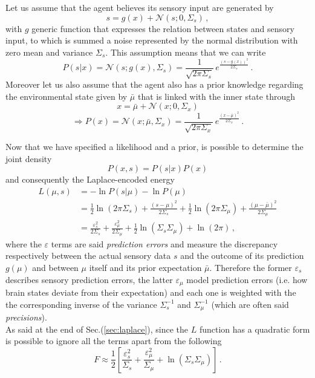 \documentclass[a4paper, 10pt]{article}
\begin{document}
Let us assume that the agent believes its sensory input are generated by
\begin{equation}
s = g(x) + \mathcal{N}(s;0,\Sigma_s) \, ,
\label{eqn:input}
\end{equation}
with $g$ generic function that expresses the relation between states and sensory input, to which is summed a noise represented by the normal distribution with zero mean and variance $\Sigma_s$. This assumption means that we can write
\begin{equation}
P(s|x) = \mathcal{N}(s;g(x),\Sigma_s) = \frac{1}{\sqrt{ 2 \pi \Sigma_{s}}} \, e^{\frac{(s-g(x))^2}{2 \Sigma_{s}}} \, .
\end{equation}
Moreover let us also assume that the agent also has a prior knowledge regarding the environmental state given by $\bar{\mu}$ that is linked with the inner state through
\begin{equation}
x = \bar{\mu} + \mathcal{N}(x;0,\Sigma_{x})
\end{equation}
\begin{equation}
\Rightarrow P(x) = \mathcal{N}(x;\bar{\mu},\Sigma_{x}) =\frac{1}{\sqrt{ 2 \pi \Sigma_{x}}} \, e^{\frac{(x-\bar{\mu})^2}{2 \Sigma_{x}}} \, .
\end{equation}

Now that we have specified a likelihood and a prior, is possible to determine the joint density
\begin{equation}
P(x,s) = P(s | x) P(x)
\end{equation}
and consequently the Laplace-encoded energy
\begin{equation}
\begin{split}
L(\mu,s) & = - \ln P(s|\mu) - \ln P(\mu)  \\
		 & = \frac{1}{2} \ln (2 \pi \Sigma_{s}) + \frac{(s-\mu)^2}{2 \Sigma_{s}} + \frac{1}{2} \ln (2 \pi \Sigma_{\mu}) + \frac{(\mu-\bar{\mu})^2}{2 \Sigma_{\mu}} \\
		 & = \frac{\varepsilon_{s}^2}{2 \Sigma_{s}} + \frac{\varepsilon_{\mu}^2}{2 \Sigma_{\mu}} + \frac{1}{2} \ln \left( \Sigma_{s} \Sigma_{\mu} \right) + \ln (2 \pi) \, ,
\end{split}
\end{equation}
where the $\varepsilon$ terms are said \emph{prediction errors} and measure the discrepancy respectively between the actual sensory data $s$ and the outcome of its prediction $g(\mu)$ and between $\mu$ itself and its prior expectation $\bar{\mu}$. Therefore the former $\varepsilon_{s}$ describes sensory prediction errors, the latter $\varepsilon_{\mu}$ model prediction errors (i.e. how brain states deviate from their expectation) and each one is weighted with the the corresponding inverse of the variance $\Sigma_{s}^{-1}$ and $\Sigma_{\mu}^{-1}$ (which are often said \emph{precisions}). \\
As said at the end of Sec.(\ref{sec:laplace}), since the $L$ function has a quadratic form is possible to ignore all the terms apart from the following
\begin{equation}
F \approx \frac{1}{2} \left[\frac{\varepsilon_{s}^2}{\Sigma_{s}} + \frac{\varepsilon_{\mu}^2}{ \Sigma_{\mu}} + \ln \left( \Sigma_{s} \Sigma_{\mu} \right) \right] \, .
\end{equation}
\end{document}
